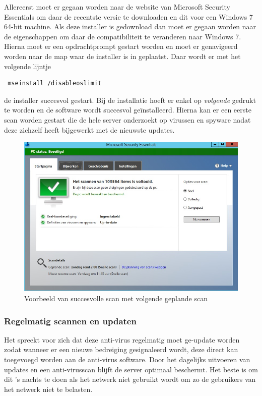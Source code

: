 \documentclass[pdftex,a4paper,12pt]{report}
\begin{document}
Allereerst moet er gegaan worden naar de website van Microsoft Security Essentials om daar de recentste versie te downloaden en dit voor een Windows 7 64-bit machine. Als deze installer is gedownload dan moet er gegaan worden naar de eigenschappen om daar de compatibiliteit te veranderen naar Windows 7. Hierna moet er een opdrachtprompt gestart worden en moet er genavigeerd worden naar de map waar de installer is in geplaatst. Daar wordt er met het volgende lijntje \begin{verbatim} mseinstall /disableoslimit \end{verbatim} de installer succesvol gestart. Bij de installatie hoeft er enkel op \textit{volgende} gedrukt te worden en de software wordt succesvol geïnstalleerd. Hierna kan er een eerste scan worden gestart die de hele server onderzoekt op virussen en spyware nadat deze zichzelf heeft bijgewerkt met de nieuwste updates. \citep{Herring2014}

\begin{figure}[H]
\begin{center}
\includegraphics[scale=0.60]{img/AntiVirus}
\end{center}
\caption{Voorbeeld van succesvolle scan met volgende geplande scan}
\label{img:AntiVirus}
\end{figure}

\subsubsection{Regelmatig scannen en updaten}
Het spreekt voor zich dat deze anti-virus regelmatig moet ge-update worden zodat wanneer er een nieuwe bedreiging gesignaleerd wordt, deze direct kan toegevoegd worden aan de anti-virus software. Door het dagelijks uitvoeren van updates en een anti-virusscan blijft de server optimaal beschermt. Het beste is om dit 's nachts te doen als het netwerk niet gebruikt wordt om zo de gebruikers van het netwerk niet te belasten. 
\end{document}
